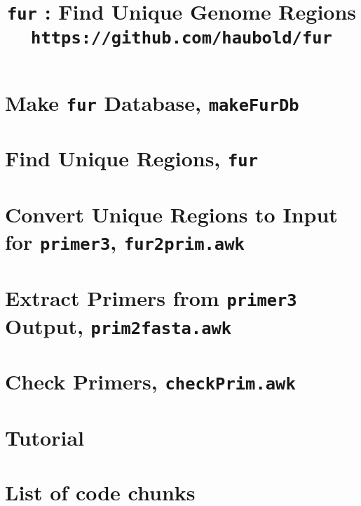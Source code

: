

\frontmatter
\pagestyle{noweb}

\title{\texttt{fur} : Find Unique Genome
Regions\\\small \texttt{https://github.com/haubold/fur}}
\author{}
\maketitle

\tableofcontents
\listoftheorems[show={tdefn}]
\mainmatter
\chapter{Make \texttt{fur} Database, \texttt{makeFurDb}}\label{ch:makeFurDb}

\chapter{Find Unique Regions, \texttt{fur}}

\chapter{Convert Unique Regions to Input for \texttt{primer3}, \texttt{fur2prim.awk}}

\chapter{Extract Primers from \texttt{primer3}
Output, \texttt{prim2fasta.awk}}

\chapter{Check Primers, \texttt{checkPrim.awk}}

\chapter{Tutorial}


\backmatter
\chapter{List of code chunks}
\nowebchunks



